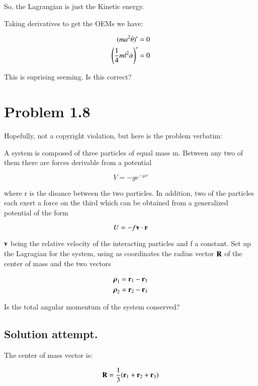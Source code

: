 \documentclass{article}      %
\newcommand{\Brho}[0]{\boldsymbol{\rho}}
\newcommand{\dotalpha}[0]{\dot{\alpha}}
\newcommand{\dottheta}[0]{\dot{\theta}}
\begin{document}
So, the Lagrangian is just the Kinetic energy.

Taking derivatives to get the OEMs we have:

\begin{align*}
(m a^2 \dottheta)' &= 0 \\
\left(\inv{4} m l^2 \dotalpha \right)' &= 0
\end{align*}

This is suprising seeming.  Is this correct?

\section{ Problem 1.8 }

Hopefully, not a copyright violation, but here is the problem verbatim:

A system is composed of three particles of equal mass m.  Between any two of them there are forces derivable from a potential

\begin{equation*}
V = -g e^{-\mu r}
\end{equation*}

where r is the disance between the two particles.  In addition, two of the particles each exert a force on the third which can be obtained from a generalized potential of the form

\begin{equation*}
U = -f \mathbf{v} \cdot \mathbf{r}
\end{equation*}

$\mathbf{v}$ being the relative velocity of the interacting particles and f a constant.  Set up the Lagragian for the system, using as coordinates the radius vector $\mathbf{R}$ of the center of mass and the two vectors

\begin{align*}
\Brho_1 &= \Br_1 - \Br_3 \\
\Brho_2 &= \Br_2 - \Br_3
\end{align*}

Is the total angular momentum of the system conserved?

\subsection{ Solution attempt. }

The center of mass vector is:

\begin{equation*}
\mathbf{R} = \frac{1}{3}(\mathbf{r}_1 + \mathbf{r}_2 + \mathbf{r}_3)
\end{equation*}
\end{document}
